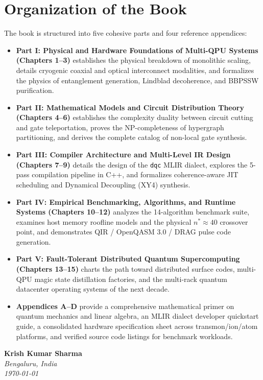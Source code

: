 \section*{Organization of the Book}
The book is structured into five cohesive parts and four reference appendices:
\begin{itemize}
    \item \textbf{Part I: Physical and Hardware Foundations of Multi-QPU Systems (Chapters 1--3)} establishes the physical breakdown of monolithic scaling, details cryogenic coaxial and optical interconnect modalities, and formalizes the physics of entanglement generation, Lindblad decoherence, and BBPSSW purification.
    \item \textbf{Part II: Mathematical Models and Circuit Distribution Theory (Chapters 4--6)} establishes the complexity duality between circuit cutting and gate teleportation, proves the NP-completeness of hypergraph partitioning, and derives the complete catalog of non-local gate synthesis.
    \item \textbf{Part III: Compiler Architecture and Multi-Level IR Design (Chapters 7--9)} details the design of the \texttt{dqc} MLIR dialect, explores the 5-pass compilation pipeline in C++, and formalizes coherence-aware JIT scheduling and Dynamical Decoupling (XY4) synthesis.
    \item \textbf{Part IV: Empirical Benchmarking, Algorithms, and Runtime Systems (Chapters 10--12)} analyzes the 14-algorithm benchmark suite, examines host memory roofline models and the physical $n^* \approx 40$ crossover point, and demonstrates QIR / OpenQASM 3.0 / DRAG pulse code generation.
    \item \textbf{Part V: Fault-Tolerant Distributed Quantum Supercomputing (Chapters 13--15)} charts the path toward distributed surface codes, multi-QPU magic state distillation factories, and the multi-rack quantum datacenter operating systems of the next decade.
    \item \textbf{Appendices A--D} provide a comprehensive mathematical primer on quantum mechanics and linear algebra, an MLIR dialect developer quickstart guide, a consolidated hardware specification sheet across transmon/ion/atom platforms, and verified source code listings for benchmark workloads.
\end{itemize}

\vspace{1.5cm}
\noindent\textbf{Krish Kumar Sharma}\\
\textit{Bengaluru, India}\\
\textit{\today}
